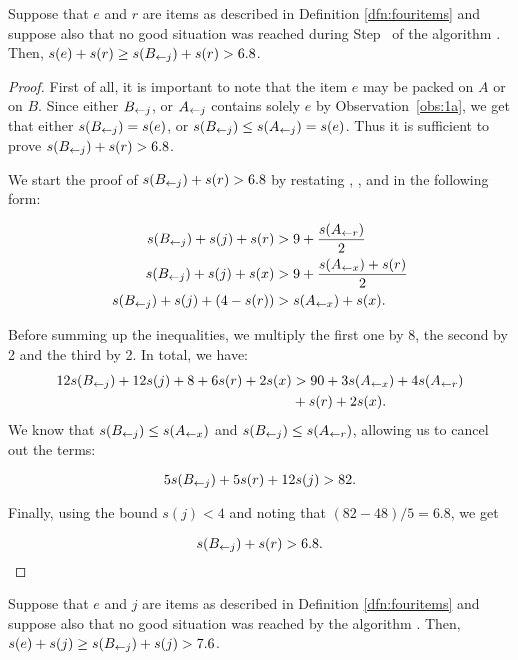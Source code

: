 \begin{lem}
Suppose that $e$ and $r$ are items as described in Definition \ref{dfn:fouritems} and suppose
also that no good situation was reached during Step~{\rm {}} of the algorithm \tbalg.
Then, $s(e) + s(r) \ge  s(B_{\leftarrow j}) + s(r) > 6.8$.
\end{lem}

\begin{proof}
First of all, it is important to note that the item $e$ may be
packed on $A$ or on $B$.
Since either $B_{\leftarrow j}$, or $A_{\leftarrow j}$ contains solely $e$
by Observation~\ref{obs:1a}, we get that either $s(B_{\leftarrow j}) = s(e)$,
or $s(B_{\leftarrow j}) \le s(A_{\leftarrow j}) = s(e)$. Thus it is sufficient to prove
$s(B_{\leftarrow j}) + s(r) > 6.8$.

We start the proof of $s(B_{\leftarrow j}) + s(r) > 6.8$ by restating , ,
and  in the following form:

\begin{align*}
s(B_{\leftarrow j}) + s(j) + s(r) &> 9 + \frac{s(A_{\leftarrow r})}{2} \\
s(B_{\leftarrow j}) + s(j) + s(x) &> 9 + \frac{s(A_{\leftarrow x}) + s(r)}{2} \\
s(B_{\leftarrow j}) + s(j) + (4 - s(r)) &> s(A_{\leftarrow x}) + s(x). 
\end{align*}

Before summing up the inequalities, we multiply the first one by 8, the
second by 2 and the third by 2. %
In total, we have:
\begin{align*}
12s(B_{\leftarrow j}) + 12s(j) + 8 + 6s(r) + 2s(x) &> 90 + 3s(A_{\leftarrow x}) + 4s(A_{\leftarrow r})\\
&+ s(r) + 2s(x). \\
\end{align*}
We know that $s(B_{\leftarrow j}) \leq s(A_{\leftarrow x})$ and $s(B_{\leftarrow j}) \leq s(A_{\leftarrow r})$, allowing us to cancel out the terms:

\[ 5s(B_{\leftarrow j}) + 5s(r) + 12s(j) > 82. \]

Finally, using the bound $s(j) < 4$ and noting that $(82 - 48)/5 = 6.8$, we get

\[ s(B_{\leftarrow j}) + s(r) > 6.8.\]
\end{proof}

\begin{lem}
Suppose that $e$ and $j$ are items as described in Definition \ref{dfn:fouritems} and suppose
also that no good situation was reached by the algorithm \tbalg.
Then, $s(e) + s(j) \ge  s(B_{\leftarrow j}) + s(j) > 7.6$.
\end{lem}


